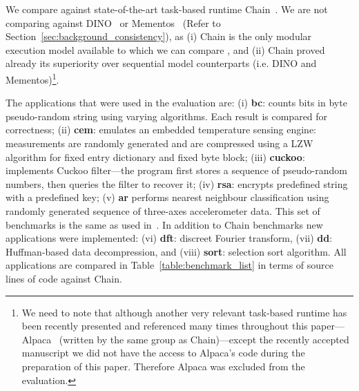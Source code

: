 We compare \sys against state-of-the-art task-based runtime Chain~\cite{chain}. We are not comparing \sys against DINO~\cite{dino} or Mementos~\cite{mementos} (Refer to Section~\ref{sec:background_consistency}), as (i) Chain is the only modular execution model available to which we can compare \sys, and (ii) Chain proved already its superiority over sequential model counterparts (i.e. DINO and Mementos)\footnote{We need to note that although another very relevant task-based runtime has been recently presented and referenced many times throughout this paper---Alpaca~\cite{alpaca} (written by the same group as Chain)---except the recently accepted manuscript we did not have the access to Alpaca's code during the preparation of this paper. Therefore Alpaca was excluded from the evaluation.}.

The applications that were used in the evaluation are: (i) \textbf{bc}: counts bits in byte pseudo-random string using varying algorithms. Each result is compared for correctness; (ii) \textbf{cem}: emulates an embedded temperature sensing engine: measurements are randomly generated and are compressed using a LZW algorithm for  fixed entry dictionary and fixed byte block; (iii) \textbf{cuckoo}: implements Cuckoo filter---the program first stores a sequence of pseudo-random numbers, then queries the filter to recover it; (iv) \textbf{rsa}: encrypts predefined string with a predefined key; (v) \textbf{ar} performs nearest neighbour classification using randomly generated sequence of three-axes accelerometer data. This set of benchmarks is the same as used in~\cite{chain,alpaca}. In addition to Chain benchmarks new applications were implemented: (vi) \textbf{dft}: discreet Fourier transform, (vii) \textbf{dd}: Huffman-based data decompression, and (viii) \textbf{sort}: selection sort algorithm. All applications are compared in Table~\ref{table:benchmark_list} in terms of source lines of code against Chain.


